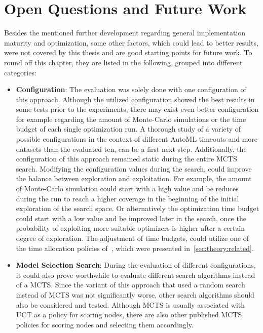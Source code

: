 \section{Open Questions and Future Work}
Besides the mentioned further development regarding general implementation maturity and optimization, some other factors, which could lead to better results, were not covered by this thesis and are good starting points for future work.
To round off this chapter, they are listed in the following, grouped into different categories:
\begin{itemize}
    \item \textbf{Configuration}: The evaluation was solely done with one configuration of this approach.
    Although the utilized configuration showed the best results in some tests prior to the experiments, there may exist even better configuration for example regarding the amount of Monte-Carlo simulations or the time budget of each single optimization run.
    A thorough study of a variety of possible configurations in the context of different AutoML timeouts and more datasets than the evaluated ten, can be a first next step.\newline
    Additionally, the configuration of this approach remained static during the entire MCTS search.
    Modifying the configuration values during the search, could improve the balance between exploration and exploitation.
    For example, the amount of Monte-Carlo simulation could start with a high value and be reduces during the run to reach a higher coverage in the beginning of the initial exploration of the search space.
    Or alternatively the optimization time budget could start with a low value and be improved later in the search, once the probability of exploiting more suitable optimizers is higher after a certain degree of exploration.
    The adjustment of time budgets, could utilize one of the time allocation policies of~\textcite{Quemy-Two-Stage-Optimization}, which were presented in~\ref{sec:theory:related}.
    \item \textbf{Model Selection Search}: During the evaluation of different configurations, it could also prove worthwhile to evaluate different search algorithms instead of a MCTS.
    Since the variant of this approach that used a random search instead of MCTS was not significantly worse, other search algorithms should also be considered and tested.\newline
    Although MCTS is usually associated with UCT as a policy for scoring nodes, there are also other published MCTS policies for scoring nodes and selecting them accordingly.

\end{itemize}
